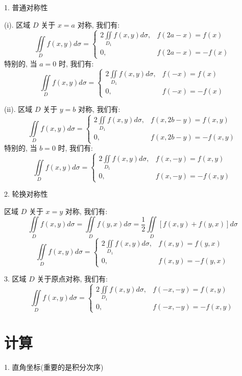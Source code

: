 \begin{theorem}[对称性]
	1. 普通对称性

	(i). 区域 $D$ 关于 $x = a$ 对称, 我们有:
	$$\iint\limits_{D} f(x,y)d\sigma = \begin{cases} 2\iint\limits_{D_{1}} f(x,y)d\sigma, & f(2a-x) = f(x) \\ 0, & f(2a-x) = -f(x)  \end{cases}$$
	特别的, 当 $a = 0$ 时, 我们有:
	$$\iint\limits_{D} f(x,y)d\sigma = \begin{cases} 2\iint\limits_{D_{1}} f(x,y)d\sigma, & f(-x) = f(x) \\ 0, & f(-x) = -f(x)  \end{cases}$$

	(ii). 区域 $D$ 关于 $y = b$ 对称, 我们有:
	$$\iint\limits_{D} f(x,y)d\sigma = \begin{cases} 2\iint\limits_{D_{1}} f(x,y)d\sigma, & f(x,2b-y) = f(x,y) \\ 0, & f(x,2b-y) = -f(x,y)  \end{cases}$$
	特别的, 当 $b = 0$ 时, 我们有:
	$$\iint\limits_{D} f(x,y)d\sigma = \begin{cases} 2\iint\limits_{D_{1}} f(x,y)d\sigma, & f(x,-y) = f(x,y) \\ 0, & f(x,-y) = -f(x,y)  \end{cases}$$

	2. 轮换对称性

	区域 $D$ 关于 $x = y$ 对称, 我们有:
	$$\iint\limits_{D} f(x,y)d\sigma = \iint\limits_{D} f(y,x)d\sigma= \dfrac{1}{2}\iint\limits_{D}\left[f(x,y)+f(y,x)\right]d\sigma$$
	$$\iint\limits_{D} f(x,y)d\sigma = \begin{cases} 2\iint\limits_{D_{1}} f(x,y)d\sigma, & f(x,y) = f(y,x) \\ 0, & f(x,y) = -f(y,x)  \end{cases}$$

	3. 区域 $D$ 关于原点对称, 我们有:
	$$\iint\limits_{D} f(x,y)d\sigma = \begin{cases} 2\iint\limits_{D_{1}} f(x,y)d\sigma, & f(-x,-y) = f(x,y) \\ 0, & f(-x,-y) = -f(x,y)  \end{cases}$$
\end{theorem}
\section{计算}

1. 直角坐标(重要的是积分次序)\label{def: 积分次序}

